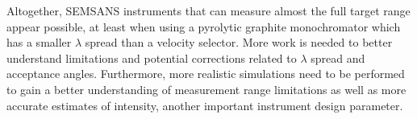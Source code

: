 Altogether, SEMSANS instruments that can measure almost the full target range appear possible, at least when using a pyrolytic graphite monochromator which has a smaller $\lambda$ spread than a velocity selector. More work is needed to better understand limitations and potential corrections related to $\lambda$ spread and acceptance angles. Furthermore, more realistic simulations need to be performed to gain a better understanding of measurement range limitations as well as more accurate estimates of intensity, another important instrument design parameter.

